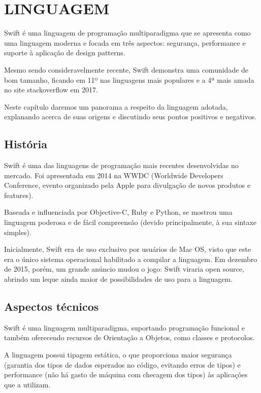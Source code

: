 \documentclass[rel_mlp]{iiufrgs}
\begin{document}
%

\chapter{LINGUAGEM} \label{intro}

Swift é uma linguagem de programação multiparadigma que se apresenta como uma linguagem moderna e focada em três aspectos: segurança, performance e suporte à aplicação de design patterns.

Mesmo sendo consideravelmente recente, Swift demonstra uma comunidade de bom tamanho, ficando em 11º nas linguagens mais populares e a 4ª mais amada no site stackoverflow em 2017.

Neste capítulo daremos um panorama a respeito da linguagem adotada, explanando acerca de suas origens e discutindo seus pontos positivos e negativos.


\section{História}

Swift é uma das linguagens de programação mais recentes desenvolvidas no mercado. Foi apresentada em 2014 na WWDC (Worldwide Developers Conference, evento organizado pela Apple para divulgação de novos produtos e features).

Baseada e influenciada por Objective-C, Ruby e Python, se mostrou uma linguagem poderosa e de fácil compreensão (devido principalmente, à sua sintaxe simples).

Inicialmente, Swift era de uso exclusivo por usuários de Mac OS, visto que este era o único sistema operacional habilitado a compilar a linguagem. Em dezembro de 2015, porém, um grande anúncio mudou o jogo: Swift viraria open source, abrindo um leque ainda maior de possibilidades de uso para a linguagem.


\section{Aspectos técnicos}

Swift é uma linguagem multiparadigma, suportando programação funcional e também oferecendo recursos de Orientação a Objetos, como classes e protocolos.

A linguagem possui tipagem estática, o que proporciona maior segurança (garantia dos tipos de dados esperados no código, evitando erros de tipos) e performance (não há gasto de máquina com checagem dos tipos) às aplicações que a utilizam.
\end{document}
